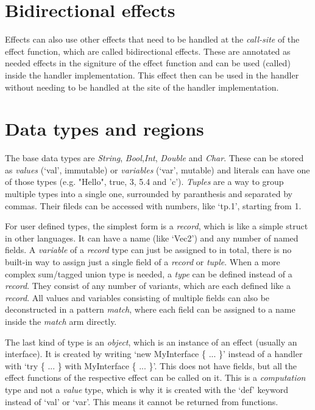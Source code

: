 \section{Bidirectional effects}

Effects can also use other effects that need to be handled at the \textit{call-site} of the effect function, which are called bidirectional effects. These are annotated as needed effects in the signiture of the effect function and can be used (called) inside the handler implementation. This effect then can be used in the handler without needing to be handled at the site of the handler implementation.

\section{Data types and regions}

The base data types are \textit{String}, \textit{Bool},\textit{Int}, \textit{Double} and \textit{Char}. These can be stored as \textit{values} (`val', immutable) or \textit{variables} (`var', mutable) and literals can have one of those types (e.g. "Hello", true, 3, 5.4 and 'c'). \textit{Tuples} are a way to group multiple types into a single one, surrounded by paranthesis and separated by commas. Their fileds can be accessed with numbers, like `tp.1', starting from 1.

For user defined types, the simplest form is a \textit{record}, which is like a simple struct in other languages. It can have a name (like `Vec2') and any number of named fields. A \textit{variable} of a \textit{record} type can just be assigned to in total, there is no built-in way to assign just a single field of a \textit{record} or \textit{tuple}. When a more complex sum/tagged union type is needed, a \textit{type} can be defined instead of a \textit{record}. They consist of any number of variants, which are each defined like a \textit{record}. All values and variables consisting of multiple fields can also be deconstructed in a pattern \textit{match}, where each field can be assigned to a name inside the \textit{match} arm directly.

The last kind of type is an \textit{object}, which is an instance of an effect (usually an interface). It is created by writing `new MyInterface \{ ... \}' instead of a handler with `try \{ ... \} with MyInterface \{ ... \}'. This does not have fields, but all the effect functions of the respective effect can be called on it. This is a \textit{computation} type and not a \textit{value} type, which is why it is created with the `def' keyword instead of `val' or `var'. This means it cannot be returned from functions.

